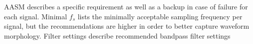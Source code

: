\begin{table}[tb]
\begin{threeparttable}
\begin{tabular}{@{}llll@{}}
                \end{tabular}
            \begin{tablenotes}
            \item  AASM describes a specific requirement as well as a backup in case of failure for each signal. Minimal \( f_s \) lists the minimally acceptable sampling frequency per signal, but the recommendations are higher in order to better capture waveform morphology. Filter settings describe recommended bandpass filter settings
            \end{tablenotes}
            \end{threeparttable}
            \end{table}
            
        
        
        
